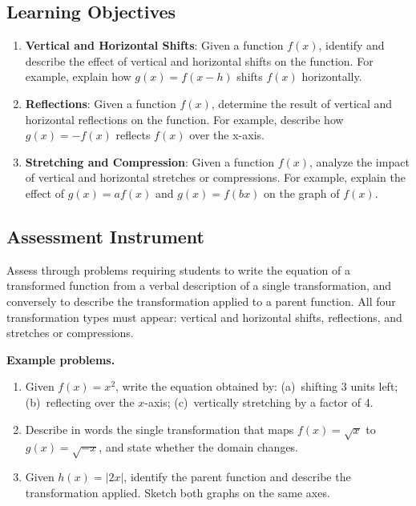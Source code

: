\subsection{Learning Objectives}
\label{ssec:lear-8667}

\begin{enumerate}
    \item \textbf{Vertical and Horizontal Shifts}: Given a function $f(x)$, identify and describe the effect of vertical and horizontal shifts on the function. For example, explain how $g(x) = f(x - h)$ shifts $f(x)$ horizontally.
    \item \textbf{Reflections}: Given a function $f(x)$, determine the result of vertical and horizontal reflections on the function. For example, describe how $g(x) = -f(x)$ reflects $f(x)$ over the x-axis.
    \item \textbf{Stretching and Compression}: Given a function $f(x)$, analyze the impact of vertical and horizontal stretches or compressions. For example, explain the effect of $g(x) = af(x)$ and $g(x) = f(bx)$ on the graph of $f(x)$.
\end{enumerate}

\subsection{Assessment Instrument}
\label{ssec:asse-37a8}

Assess through problems requiring students to write the equation of a transformed function
from a verbal description of a single transformation, and conversely to describe the
transformation applied to a parent function. All four transformation types must appear:
vertical and horizontal shifts, reflections, and stretches or compressions.

\textbf{Example problems.}

\begin{enumerate}
    \item Given $f(x) = x^2$, write the equation obtained by: (a)~shifting 3 units left; (b)~reflecting over the $x$-axis; (c)~vertically stretching by a factor of 4.
    \item Describe in words the single transformation that maps $f(x) = \sqrt{x}$ to $g(x) = \sqrt{-x}$, and state whether the domain changes.
    \item Given $h(x) = |2x|$, identify the parent function and describe the transformation applied. Sketch both graphs on the same axes.
\end{enumerate}

